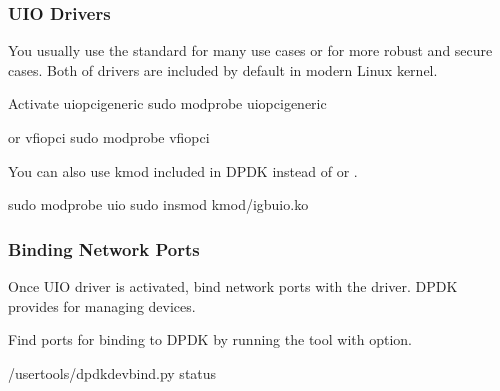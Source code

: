 \documentclass[a4paper,11pt,openany,oneside,english]{sphinxmanual}
\begin{document}
\subsubsection{UIO Drivers}
\label{\detokenize{gsg/install:uio-drivers}}
You usually use the standard  for many use cases
or  for more robust and secure cases.
Both of drivers are included by default in modern Linux kernel.

\begin{sphinxVerbatim}[commandchars=\\\{\},formatcom=\footnotesize]
 Activate uio\PYGZus{}pci\PYGZus{}generic
 sudo modprobe uio\PYGZus{}pci\PYGZus{}generic

 or vfio\PYGZhy{}pci
 sudo modprobe vfio\PYGZhy{}pci
\end{sphinxVerbatim}

You can also use kmod included in DPDK instead of 
or .

\begin{sphinxVerbatim}[commandchars=\\\{\},formatcom=\footnotesize]
 sudo modprobe uio
 sudo insmod kmod/igb\PYGZus{}uio.ko
\end{sphinxVerbatim}


\subsubsection{Binding Network Ports}
\label{\detokenize{gsg/install:binding-network-ports}}
Once UIO driver is activated, bind network ports with the driver.
DPDK provides  for managing devices.

Find ports for binding to DPDK by running the tool with  option.

\begin{sphinxVerbatim}[commandchars=\\\{\},formatcom=\footnotesize]
 /usertools/dpdk\PYGZhy{}devbind.py \PYGZhy{}\PYGZhy{}status



\end{sphinxVerbatim}
\end{document}
